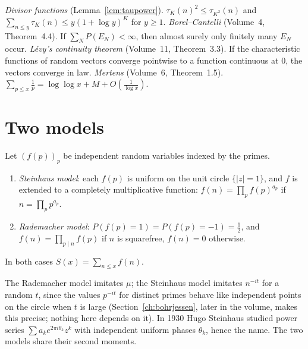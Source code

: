 \begin{reminder}
\emph{Divisor functions} (Lemma~\ref{lem:taupower}). $\tau_K(n)^2\le\tau_{K^2}(n)$ and $\sum_{n\le y}\tau_K(n)\le y(1+\log y)^K$ for $y\ge1$.
\emph{Borel--Cantelli} (Volume~4, Theorem~4.4). If $\sum_NP(E_N)<\infty$, then almost surely only finitely many $E_N$ occur.
\emph{Lévy's continuity theorem} (Volume~11, Theorem~3.3). If the characteristic functions of random vectors converge pointwise to a function continuous at $0$, the vectors converge in law.
\emph{Mertens} (Volume~6, Theorem~1.5). $\sum_{p\le x}\frac1p=\log\log x+M+O(\frac1{\log x})$.
\end{reminder}

\section{Two models}\label{sec:twomodels}

\begin{definition}\label{def:rmf}
Let $(f(p))_p$ be independent random variables indexed by the primes.
\begin{enumerate}[label=(\alph*)]
\item \emph{Steinhaus model}: each $f(p)$ is uniform on the unit circle $\{|z|=1\}$, and $f$ is extended to a completely multiplicative function: $f(n)=\prod_pf(p)^{a_p}$ if $n=\prod_pp^{a_p}$.
\item \emph{Rademacher model}: $P(f(p)=1)=P(f(p)=-1)=\frac12$, and $f(n)=\prod_{p\mid n}f(p)$ if $n$ is squarefree, $f(n)=0$ otherwise.
\end{enumerate}
In both cases $S(x)=\sum_{n\le x}f(n)$.
\end{definition}

The Rademacher model imitates $\mu$; the Steinhaus model imitates $n^{-it}$ for a random $t$, since the values $p^{-it}$ for distinct primes behave like independent points on the circle when $t$ is large (Section~\ref{ch:bohrjessen}, later in the volume, makes this precise; nothing here depends on it). In 1930 Hugo Steinhaus studied power series $\sum a_ke^{2\pi i\theta_k}z^k$ with independent uniform phases $\theta_k$, hence the name. The two models share their second moments.

